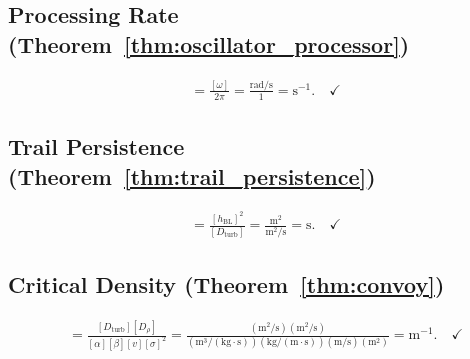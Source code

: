 \documentclass[11pt,twocolumn,a4paper]{article}
\theoremstyle{plain}
\theoremstyle{definition}
\theoremstyle{remark}
\newcommand{\Rcompute}{R_{\mathrm{compute}}}
\newcommand{\taumix}{\tau_{\mathrm{mix}}}
\newcommand{\Dturb}{D_{\mathrm{turb}}}
\newcommand{\hBL}{h_{\mathrm{BL}}}
\newcommand{\rhoc}{\rho_{\mathrm{c}}}
\begin{document}
\subsection{Processing Rate (Theorem~\ref{thm:oscillator_processor})}
\begin{align}
[\Rcompute] &= \frac{[\omega]}{2\pi} = \frac{\text{rad/s}}{1} = \text{s}^{-1}. \quad\checkmark
\end{align}

\subsection{Trail Persistence (Theorem~\ref{thm:trail_persistence})}
\begin{align}
[\taumix] &= \frac{[\hBL]^2}{[\Dturb]} = \frac{\text{m}^2}{\text{m}^2/\text{s}} = \text{s}. \quad\checkmark
\end{align}

\subsection{Critical Density (Theorem~\ref{thm:convoy})}
\begin{align}
[\rhoc] &= \frac{[\Dturb][D_\rho]}{[\alpha][\beta][v][\sigma]^2} = \frac{(\text{m}^2/\text{s})(\text{m}^2/\text{s})}{(\text{m}^3/(\text{kg}\cdot\text{s}))(\text{kg}/(\text{m}\cdot\text{s}))(\text{m/s})(\text{m}^2)} = \text{m}^{-1}. \quad\checkmark
\end{align}
\end{document}
